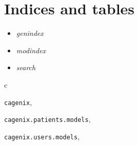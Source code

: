 \documentclass[letterpaper,10pt,english]{sphinxmanual}
\begin{document}
\chapter{Indices and tables}
\label{index:indices-and-tables}\begin{itemize}
\item {} 
\emph{genindex}

\item {} 
\emph{modindex}

\item {} 
\emph{search}

\end{itemize}


\renewcommand{\indexname}{Python Module Index}
\begin{theindex}
\def\bigletter#1{{\Large\sffamily#1}\nopagebreak\vspace{1mm}}
\bigletter{c}
\item {\texttt{cagenix}}, \pageref{dev-overview:module-cagenix}
\item {\texttt{cagenix.patients.models}}, \pageref{dev-patients:module-cagenix.patients.models}
\item {\texttt{cagenix.users.models}}, \pageref{dev-users:module-cagenix.users.models}
\end{theindex}

\renewcommand{\indexname}{Index}
\printindex
\end{document}
